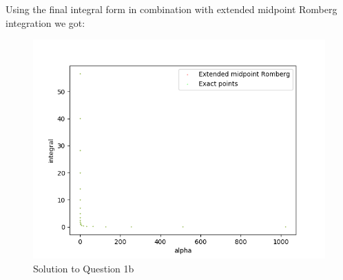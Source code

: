 Using the final integral form in combination with extended midpoint Romberg integration we got:
\begin{figure}[h!]
  \centering
  \includegraphics[width=0.9\linewidth]{./plots/gaussianintegral}
  \caption{Solution to Question 1b}
  \label{fig:fig2}
\end{figure}

\pagebreak
